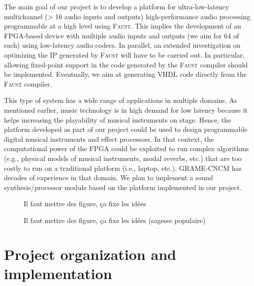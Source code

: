 \documentclass[a4paper,10pt]{article}
\newcommand{\F}{\textsc{Faust}}
\newcommand{\PP}{our project}
\begin{document}
The main goal of \PP{} is to develop a platform for ultra-low-latency multichannel (> 16 audio inputs and outputs) high-performance audio processing programmable at a high level using \F{}. This implies the development of an FPGA-based device with multiple audio inputs and outputs (we aim for 64 of each) using low-latency audio codecs. In parallel, an extended investigation on optimizing the IP generated by \F{} will have to be carried out. In particular, allowing fixed-point support in the code generated by the \F{} compiler should be implemented. Eventually, we aim at generating VHDL code directly from the \F{} compiler. %

This type of system has a wide range of applications in multiple domains. As mentioned earlier, music technology is in high demand for low latency because it helps increasing the playability of musical instruments on stage. Hence, the platform developed as part of \PP{} could be used to design programmable digital musical instruments and effect processors. In that context, the computational power of the FPGA could be exploited to run complex algorithms (e.g., physical models of musical instruments, modal reverbs, etc.) that are too costly to run on a traditional platform (i.e., laptop, etc.). GRAME-CNCM has decades of experience in that domain. We plan to implement a sound synthesis/processor module based on the platform implemented in \PP{}.




\begin{figure}[h]
  \centerline{Il faut mettre des figure, ça fixe les idées}
    \caption{Il faut mettre des figure, ça fixe les idées (sagesse populaire)}
\label{fig1}
\end{figure}
\section{Project organization and implementation}
\end{document}
